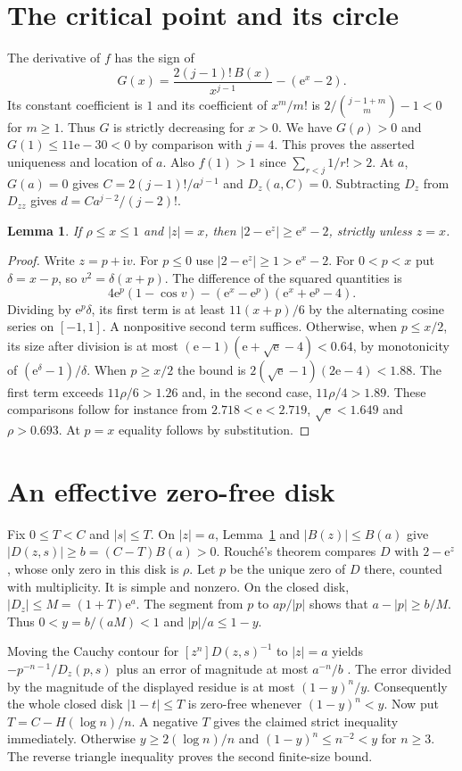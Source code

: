 \documentclass[11pt]{article}
\newtheorem{lemma}[theorem]{Lemma}
\newcommand{\ee}{\mathrm e}
\newcommand{\ii}{\mathrm i}
\begin{document}
\section{The critical point and its circle}
The derivative of $f$ has the sign of
\[
 G(x)=\frac{2(j-1)!\,B(x)}{x^{j-1}}-(\ee^x-2).
\]
Its constant coefficient is $1$ and its coefficient of $x^m/m!$ is $2/\binom{j-1+m}{m}-1<0$ for $m\ge1$. Thus $G$ is strictly decreasing for $x>0$. We have $G(\rho)>0$ and $G(1)\le 11\ee-30<0$ by comparison with $j=4$. This proves the asserted uniqueness and location of $a$. Also $f(1)>1$ since $\sum_{r<j}1/r!>2$. At $a$, $G(a)=0$ gives $C=2(j-1)!/a^{j-1}$ and $D_z(a,C)=0$. Subtracting $D_z$ from $D_{zz}$ gives $d=C a^{j-2}/(j-2)!$.

\begin{lemma}\label{circle}
If $\rho\le x\le1$ and $|z|=x$, then $|2-\ee^z|\ge\ee^x-2$, strictly unless $z=x$.
\end{lemma}
\begin{proof}
Write $z=p+\ii v$. For $p\le0$ use $|2-\ee^z|\ge1>\ee^x-2$. For $0<p<x$ put $\delta=x-p$, so $v^2=\delta(x+p)$. The difference of the squared quantities is
\[
 4\ee^p(1-\cos v)-(\ee^x-\ee^p)(\ee^x+\ee^p-4).
\]
Dividing by $\ee^p\delta$, its first term is at least $11(x+p)/6$ by the alternating cosine series on $[-1,1]$. A nonpositive second term suffices. Otherwise, when $p\le x/2$, its size after division is at most $(\ee-1)(\ee+\sqrt{\ee}-4)<0.64$, by monotonicity of $(\ee^\delta-1)/\delta$. When $p\ge x/2$ the bound is $2(\sqrt{\ee}-1)(2\ee-4)<1.88$. The first term exceeds $11\rho/6>1.26$ and, in the second case, $11\rho/4>1.89$. These comparisons follow for instance from $2.718<\ee<2.719$, $\sqrt{\ee}<1.649$ and $\rho>0.693$. At $p=x$ equality follows by substitution.
\end{proof}

\section{An effective zero-free disk}
Fix $0\le T<C$ and $|s|\le T$. On $|z|=a$, Lemma~\ref{circle} and $|B(z)|\le B(a)$ give $|D(z,s)|\ge b=(C-T)B(a)>0$. Rouch\'e's theorem compares $D$ with $2-\ee^z$, whose only zero in this disk is $\rho$. Let $p$ be the unique zero of $D$ there, counted with multiplicity. It is simple and nonzero. On the closed disk, $|D_z|\le M=(1+T)\ee^a$. The segment from $p$ to $ap/|p|$ shows that $a-|p|\ge b/M$. Thus $0<y=b/(aM)<1$ and $|p|/a\le1-y$.

Moving the Cauchy contour for $[z^n]D(z,s)^{-1}$ to $|z|=a$ yields $-p^{-n-1}/D_z(p,s)$ plus an error of magnitude at most $a^{-n}/b$ \cite[Chap.~IV]{fs}. The error divided by the magnitude of the displayed residue is at most $(1-y)^n/y$. Consequently the whole closed disk $|1-t|\le T$ is zero-free whenever $(1-y)^n<y$. Now put $T=C-H(\log n)/n$. A negative $T$ gives the claimed strict inequality immediately. Otherwise $y\ge2(\log n)/n$ and $(1-y)^n\le n^{-2}<y$ for $n\ge3$. The reverse triangle inequality proves the second finite-size bound.
\end{document}
